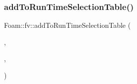 \mbox{\label{namespaceFoam_1_1fv_a1f632a3d6c6e680bdcb778de19598fce}} 
\subsubsection{\texorpdfstring{add\+To\+Run\+Time\+Selection\+Table()}{addToRunTimeSelectionTable()}}
{\footnotesize\ttfamily Foam\+::fv\+::add\+To\+Run\+Time\+Selection\+Table (\begin{DoxyParamCaption}\item[{option}]{,  }\item[{\hyperlink{classFoam_1_1fv_1_1coupledAccelerationSource}{coupled\+Acceleration\+Source}}]{,  }\item[{dictionary}]{ }\end{DoxyParamCaption})}

